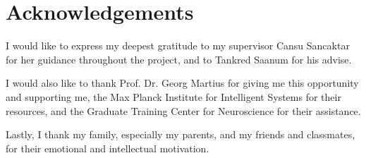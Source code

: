 \chapter*{Acknowledgements}

I would like to express my deepest gratitude to my supervisor Cansu Sancaktar for her guidance throughout the project, and to Tankred Saanum for his advise.\\\vspace{-12pt}

I would also like to thank Prof. Dr. Georg Martius for giving me this opportunity and supporting me, the Max Planck Institute for Intelligent Systems for their resources, and the Graduate Training Center for Neuroscience for their assistance.\\\vspace{-12pt}

Lastly, I thank my family, especially my parents, and my friends and classmates, for their emotional and intellectual motivation.
